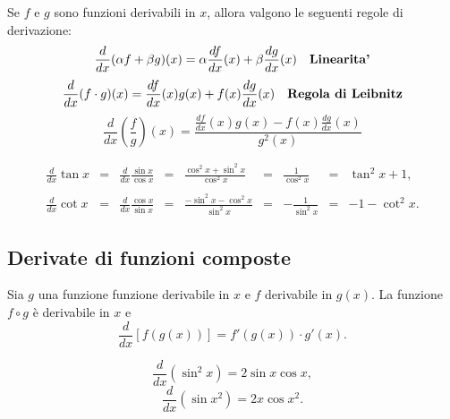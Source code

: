 \begin{theorem}
    Se $f$ e $g$ sono funzioni derivabili in $x$, allora valgono le seguenti regole di derivazione:
    \begin{equation*}
        \frac{d}{dx}(\alpha f+\beta g)(x) = \alpha\frac{df}{dx}(x)+\beta\frac{dg}{dx}(x) \quad\text{\textbf{Linearita'}}
    \end{equation*}
    \begin{equation*}
        \frac{d}{dx}(f\cdot g)(x) = \frac{df}{dx}(x)g(x)+f(x)\frac{dg}{dx}(x)
              \quad\text{\textbf{Regola di Leibnitz}}
    \end{equation*}
    \begin{equation*}
        \frac{d}{dx}\left(\frac{f}{g}\right)(x)=\frac{\frac{df}{dx}(x)g(x) - f(x)\frac{dg}{dx}(x)}{g^2(x)}
    \end{equation*}
\end{theorem}

\begin{example}
    \begin{equation*}
        \begin{matrix}
            \frac{d}{dx}\tan x &=& \frac{d}{dx}\frac{\sin x}{\cos x} &=& \frac{\cos^2x+\sin^2 x}{\cos^2 x} &=& \frac{1}{\cos^2 x}&=& \tan^2 x+1,\\\\
            \frac{d}{dx}\cot x &=& \frac{d}{dx}\frac{\cos x}{\sin x} &=& \frac{-\sin^2x-\cos^2 x}{\sin^2x}&=&-\frac{1}{\sin^2x}&=&-1-\cot^2 x.
        \end{matrix}
    \end{equation*}
\end{example}

\subsection{Derivate di funzioni composte}
\begin{theorem}
    Sia $g$ una funzione funzione derivabile in $x$ e $f$ derivabile in $g(x)$. La funzione $f\circ g$ è derivabile in $x$ e
    \begin{equation*}
        \frac{d}{dx}[f(g(x))]=f'(g(x))\cdot g'(x).
    \end{equation*}
\end{theorem}

\begin{example}
    \begin{equation*}
        \frac{d}{dx}(\sin^2x)=2\sin x\cos x,
    \end{equation*}
    \begin{equation*}
        \frac{d}{dx}(\sin x^2)=2x\cos x^2.
    \end{equation*}
\end{example}


